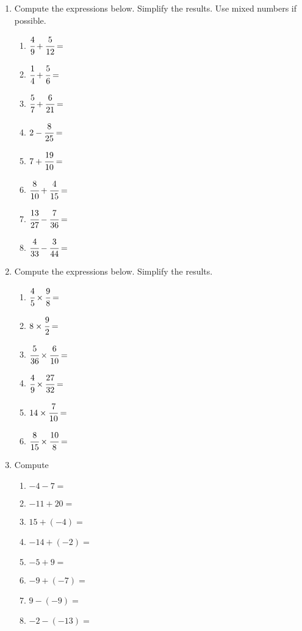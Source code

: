 \documentclass[12pt,letterpaper]{article}
\author{Shawn Ma}
\date{\today}
\begin{document}
\setlength{\parindent}{0pt}

\begin{enumerate}
    \item Compute the expressions below. Simplify the results. Use mixed numbers if possible.
    \begin{multicols}{2}
    \begin{enumerate}
        \item $\cfrac{4}{9}+\cfrac{5}{12}=$
        \item $\cfrac{1}{4}+\cfrac{5}{6}=$
        \item $\cfrac{5}{7}+\cfrac{6}{21}=$
        \item $2-\cfrac{8}{25}=$
        \item $7+\cfrac{19}{10}=$
        \item $\cfrac{8}{10}+\cfrac{4}{15}=$
        \item $\cfrac{13}{27}-\cfrac{7}{36}=$
        \item $\cfrac{4}{33}-\cfrac{3}{44}=$
    \end{enumerate}
    \end{multicols}

    \item Compute the expressions below. Simplify the results.
    \begin{multicols}{2}
    \begin{enumerate}
        \item $\cfrac{4}{5}\times\cfrac{9}{8}=$
        \item $8\times\cfrac{9}{2}=$
        \item $\cfrac{5}{36}\times\cfrac{6}{10}=$
        \item $\cfrac{4}{9}\times\cfrac{27}{32}=$
        \item $14\times\cfrac{7}{10}=$
        \item $\cfrac{8}{15}\times\cfrac{10}{8}=$
    \end{enumerate}
    \end{multicols}
    \item Compute
    \begin{multicols}{2}
        \begin{enumerate}
            \item $-4-7=$
            \item $-11+20=$
            \item $15+(-4)=$
            \item $-14+(-2)=$
            \item $-5+9=$
            \item $-9+(-7)=$
            \item $9-(-9)=$
            \item $-2-(-13)=$
        \end{enumerate}
        \end{multicols}
        \pagebreak


\end{enumerate}
\end{document}
